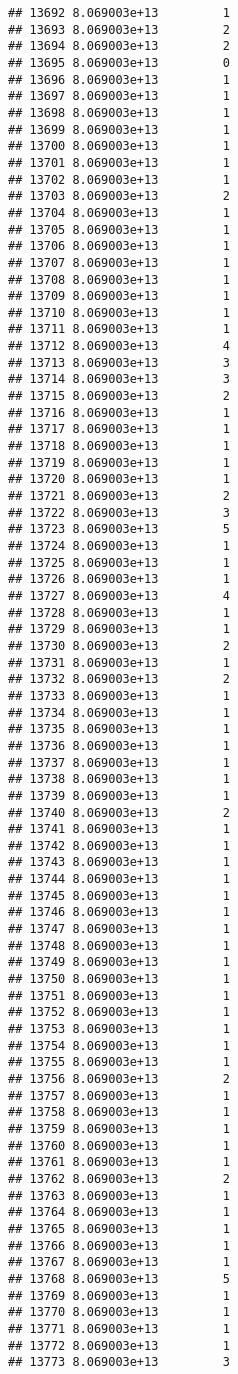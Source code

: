 \documentclass[
]{article}
\begin{document}
\begin{verbatim}
## 13692 8.069003e+13         1
## 13693 8.069003e+13         2
## 13694 8.069003e+13         2
## 13695 8.069003e+13         0
## 13696 8.069003e+13         1
## 13697 8.069003e+13         1
## 13698 8.069003e+13         1
## 13699 8.069003e+13         1
## 13700 8.069003e+13         1
## 13701 8.069003e+13         1
## 13702 8.069003e+13         1
## 13703 8.069003e+13         2
## 13704 8.069003e+13         1
## 13705 8.069003e+13         1
## 13706 8.069003e+13         1
## 13707 8.069003e+13         1
## 13708 8.069003e+13         1
## 13709 8.069003e+13         1
## 13710 8.069003e+13         1
## 13711 8.069003e+13         1
## 13712 8.069003e+13         4
## 13713 8.069003e+13         3
## 13714 8.069003e+13         3
## 13715 8.069003e+13         2
## 13716 8.069003e+13         1
## 13717 8.069003e+13         1
## 13718 8.069003e+13         1
## 13719 8.069003e+13         1
## 13720 8.069003e+13         1
## 13721 8.069003e+13         2
## 13722 8.069003e+13         3
## 13723 8.069003e+13         5
## 13724 8.069003e+13         1
## 13725 8.069003e+13         1
## 13726 8.069003e+13         1
## 13727 8.069003e+13         4
## 13728 8.069003e+13         1
## 13729 8.069003e+13         1
## 13730 8.069003e+13         2
## 13731 8.069003e+13         1
## 13732 8.069003e+13         2
## 13733 8.069003e+13         1
## 13734 8.069003e+13         1
## 13735 8.069003e+13         1
## 13736 8.069003e+13         1
## 13737 8.069003e+13         1
## 13738 8.069003e+13         1
## 13739 8.069003e+13         1
## 13740 8.069003e+13         2
## 13741 8.069003e+13         1
## 13742 8.069003e+13         1
## 13743 8.069003e+13         1
## 13744 8.069003e+13         1
## 13745 8.069003e+13         1
## 13746 8.069003e+13         1
## 13747 8.069003e+13         1
## 13748 8.069003e+13         1
## 13749 8.069003e+13         1
## 13750 8.069003e+13         1
## 13751 8.069003e+13         1
## 13752 8.069003e+13         1
## 13753 8.069003e+13         1
## 13754 8.069003e+13         1
## 13755 8.069003e+13         1
## 13756 8.069003e+13         2
## 13757 8.069003e+13         1
## 13758 8.069003e+13         1
## 13759 8.069003e+13         1
## 13760 8.069003e+13         1
## 13761 8.069003e+13         1
## 13762 8.069003e+13         2
## 13763 8.069003e+13         1
## 13764 8.069003e+13         1
## 13765 8.069003e+13         1
## 13766 8.069003e+13         1
## 13767 8.069003e+13         1
## 13768 8.069003e+13         5
## 13769 8.069003e+13         1
## 13770 8.069003e+13         1
## 13771 8.069003e+13         1
## 13772 8.069003e+13         1
## 13773 8.069003e+13         3

\end{verbatim}
\end{document}
